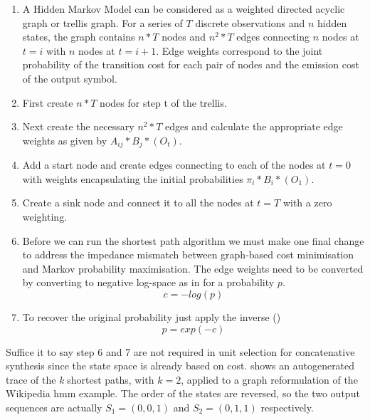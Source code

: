 {{{{{{{{\begin{enumerate}
  \item A Hidden Markov Model can be considered as a weighted directed acyclic graph or trellis graph. For a series of $T$ discrete observations and $n$ hidden states, the graph contains $n*T$ nodes and $n^{2}*T$ edges connecting $n$ nodes at $t=i$ with $n$ nodes at $t=i+1$. Edge weights correspond to the joint probability of the transition cost for each pair of nodes and the emission cost of the output symbol.
  \item First create $n*T$ nodes  for step t of the trellis.
  \item Next create the necessary $n^2*T$ edges and calculate the appropriate edge weights as given by $A_{ij}*B_{j}*(O_{t})$. 
  \item Add a start node and create edges connecting to each of the nodes at $t=0$ with weights encapsulating the initial probabilities $\pi_{i}*B_{i}*(O_{1})$.
  \item Create a sink node and connect it to all the nodes at $t=T$ with a zero weighting.
  \item Before we can run the shortest path algorithm we must make one final change to address the impedance mismatch between graph-based cost minimisation and Markov probability maximisation. The edge weights need to be converted by converting to negative log-space as in   for a probability $p$.
  \begin{equation}
\label{eq:log_cost}
c = -log(p)
\end{equation}
  \item To recover the original probability just apply the inverse ()
\begin{equation}
\label{eq:prob_cost}
p = exp(-c)
\end{equation}
\end{enumerate}

Suffice it to say step 6 and 7 are not required in unit selection for concatenative synthesis since the state space is already based on cost.  shows an autogenerated trace of the \textit{k} shortest paths, with $k=2$, applied to a graph reformulation of the Wikipedia \acrshort{hmm} example. The order of the states are reversed, so the two output sequences are actually $S_1 = (0, 0, 1)$ and $S_2 = (0, 1, 1)$ respectively.
 
}}}}}}}}
